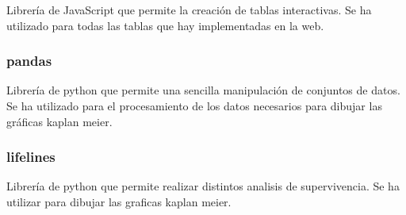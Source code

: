 Librería de JavaScript que permite la creación de tablas interactivas. Se ha utilizado para todas las tablas que hay implementadas en la web.

\subsubsection{pandas}

Librería de python que permite una sencilla manipulación de conjuntos de datos. Se ha utilizado para el procesamiento de los datos necesarios para dibujar las gráficas kaplan meier.

\subsubsection{lifelines}

Librería de python que permite realizar distintos analisis de supervivencia. Se ha utilizar para dibujar las graficas kaplan meier.



